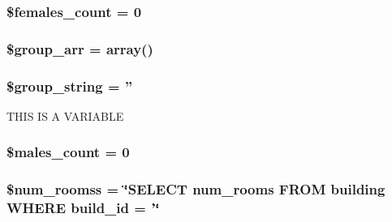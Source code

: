 \hypertarget{index_8php_a6b8782dbe4c91ae2ca45031af651d818}{
\subsubsection[{\$females\-\_\-count}]{\setlength{\rightskip}{0pt plus 5cm}\$females\-\_\-count = 0}}\label{index_8php_a6b8782dbe4c91ae2ca45031af651d818}
\hypertarget{index_8php_aacdcd61fee4523e3e12b143603e10590}{
\subsubsection[{\$group\-\_\-arr}]{\setlength{\rightskip}{0pt plus 5cm}\$group\-\_\-arr = array()}}\label{index_8php_aacdcd61fee4523e3e12b143603e10590}
\hypertarget{index_8php_a9f3ee723b1a892569e6de7af06e4e7b5}{
\subsubsection[{\$group\-\_\-string}]{\setlength{\rightskip}{0pt plus 5cm}\$group\-\_\-string = ''}}\label{index_8php_a9f3ee723b1a892569e6de7af06e4e7b5}
\-T\-H\-I\-S \-I\-S \-A \-V\-A\-R\-I\-A\-B\-L\-E \hypertarget{index_8php_a8d7947787809be82314a3f1843adb460}{
\subsubsection[{\$males\-\_\-count}]{\setlength{\rightskip}{0pt plus 5cm}\$males\-\_\-count = 0}}\label{index_8php_a8d7947787809be82314a3f1843adb460}
\hypertarget{index_8php_a042bc70123c1cedbe0ebc14950c86267}{
\subsubsection[{\$num\-\_\-roomss}]{\setlength{\rightskip}{0pt plus 5cm}\$num\-\_\-roomss = \char`\"{}\-S\-E\-L\-E\-C\-T num\-\_\-rooms \-F\-R\-O\-M building \-W\-H\-E\-R\-E build\-\_\-id = '\char`\"{}}}\label{index_8php_a042bc70123c1cedbe0ebc14950c86267}
